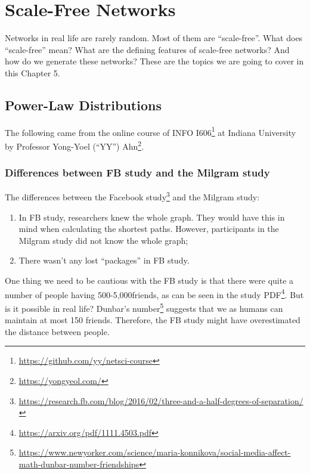 \documentclass[
]{krantz}
\makeatletter
\renewcommand{\href}[2]{#2\footnote{\url{#1}}}
\newenvironment{kframe}{%
\medskip{}
\setlength{\fboxsep}{.8em}
 \def\at@end@of@kframe{}%
 \ifinner\ifhmode%
  \def\at@end@of@kframe{\end{minipage}}%
  \begin{minipage}{\columnwidth}%
 \fi\fi%
 \def\FrameCommand##1{\hskip\@totalleftmargin \hskip-\fboxsep
 \colorbox{shadecolor}{##1}\hskip-\fboxsep
     \hskip-\linewidth \hskip-\@totalleftmargin \hskip\columnwidth}%
 \MakeFramed {\advance\hsize-\width
   \@totalleftmargin\z@ \linewidth\hsize
   \@setminipage}}%
 {\par\unskip\endMakeFramed%
 \at@end@of@kframe}
\newenvironment{rmdblock}[1]
  {
  \begin{itemize}
  \renewcommand{\labelitemi}{
    \raisebox{-.7\height}[0pt][0pt]{
      {\setkeys{Gin}{width=3em,keepaspectratio}\texttt{[image: images/\#1]}}
    }
  }
  \setlength{\fboxsep}{1em}
  \begin{kframe}
  \item
  }
  {
  \end{kframe}
  \end{itemize}
  }
\newenvironment{rmdnote}
  {\begin{rmdblock}{note}}
  {\end{rmdblock}}
\makeatother
\begin{document}
\hypertarget{scale-free}{%
\chapter{Scale-Free Networks}\label{scale-free}}

Networks in real life are rarely random. Most of them are ``scale-free''. What does ``scale-free'' mean? What are the defining features of scale-free networks? And how do we generate these networks? These are the topics we are going to cover in this Chapter 5.

\hypertarget{power-law-distributions}{%
\section{Power-Law Distributions}\label{power-law-distributions}}

\begin{rmdnote}
The following came from the online course of \href{https://github.com/yy/netsci-course}{INFO I606} at Indiana University by Professor \href{https://yongyeol.com/}{Yong-Yoel (``YY'') Ahn}.
\end{rmdnote}

\hypertarget{differences-between-fb-study-and-the-milgram-study}{%
\subsection{Differences between FB study and the Milgram study}\label{differences-between-fb-study-and-the-milgram-study}}

The differences between the \href{https://research.fb.com/blog/2016/02/three-and-a-half-degrees-of-separation/}{Facebook study} and the Milgram study:

\begin{enumerate}
\def\labelenumi{\arabic{enumi}.}
\item
  In FB study, researchers knew the whole graph. They would have this in mind when calculating the shortest paths. However, participants in the Milgram study did not know the whole graph;
\item
  There wasn't any lost ``packages'' in FB study.
\end{enumerate}

One thing we need to be cautious with the FB study is that there were quite a number of people having 500-5,000friends, as can be seen in the \href{https://arxiv.org/pdf/1111.4503.pdf}{study PDF}. But is it possible in real life? \href{https://www.newyorker.com/science/maria-konnikova/social-media-affect-math-dunbar-number-friendships}{Dunbar's number} suggests that we as humans can maintain at most 150 friends. Therefore, the FB study might have overestimated the distance between people.
\end{document}
